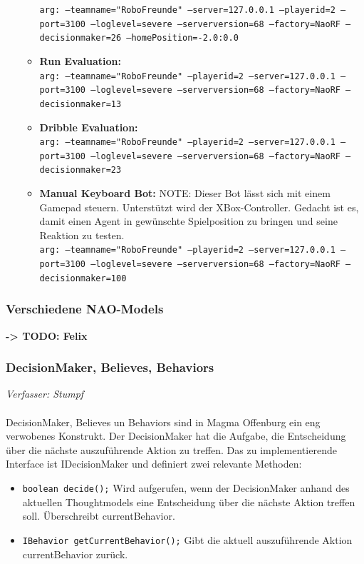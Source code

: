 \documentclass[fontsize=12pt,a4paper,final]{scrartcl}[2003/01/01]
\begin{document}
\begin{itemize}
\begin{itemize}
\texttt{arg: --teamname="RoboFreunde" --server=127.0.0.1 --playerid=2 --port=3100 --loglevel=severe --serverversion=68 --factory=NaoRF --decisionmaker=26 --homePosition=-2.0:0.0}
	\item \textbf{Run Evaluation:}\\
\texttt{arg: --teamname="RoboFreunde" --playerid=2 --server=127.0.0.1  --port=3100 --loglevel=severe --serverversion=68 --factory=NaoRF --decisionmaker=13}
	\item \textbf{Dribble Evaluation:}\\
\texttt{arg: --teamname="RoboFreunde" --playerid=2 --server=127.0.0.1  --port=3100 --loglevel=severe --serverversion=68 --factory=NaoRF --decisionmaker=23}
	\item \textbf{Manual Keyboard Bot:} NOTE: Dieser Bot lässt sich mit einem Gamepad steuern. Unterstützt wird der XBox-Controller. Gedacht ist es, damit einen Agent in gewünschte Spielposition zu bringen und seine Reaktion zu testen.\\
\texttt{arg: --teamname="RoboFreunde" --playerid=2 --server=127.0.0.1  --port=3100 --loglevel=severe --serverversion=68 --factory=NaoRF --decisionmaker=100}
	\end{itemize}
\end{itemize}

\subsubsection{Verschiedene NAO-Models}
\textbf{-> TODO: Felix}

\subsubsection{DecisionMaker, Believes, Behaviors}
\textit{Verfasser: Stumpf}\\
\\
DecisionMaker, Believes un Behaviors sind in Magma Offenburg ein eng verwobenes Konstrukt. Der DecisionMaker hat die Aufgabe, die Entscheidung über die nächste auszuführende Aktion zu treffen. Das zu implementierende Interface ist IDecisionMaker und definiert zwei relevante Methoden:
\begin{itemize}
\item \texttt{boolean decide();} Wird aufgerufen, wenn der DecisionMaker anhand des aktuellen Thoughtmodels eine Entscheidung über die nächste Aktion treffen soll. Überschreibt currentBehavior.
\item \texttt{IBehavior getCurrentBehavior();} Gibt die aktuell auszuführende Aktion currentBehavior zurück.
\end{itemize}
\end{document}
